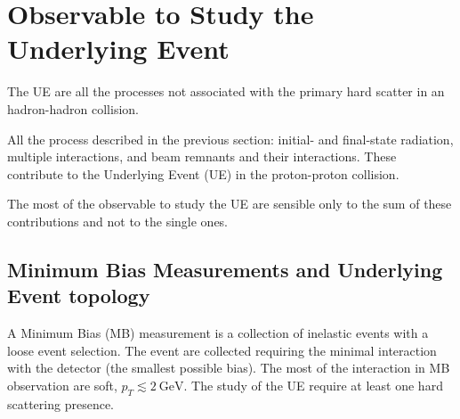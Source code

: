 \chapter{Observable to Study the Underlying Event}

The UE are all the processes not associated with the primary hard scatter in an hadron-hadron collision.

All the process described in the previous section: initial- and final-state radiation, multiple interactions, and beam
remnants and their interactions. These contribute to the Underlying Event (UE) in the proton-proton collision.

The most of the observable to study the UE are sensible only to the sum of these contributions and not to the single ones.

\section{Minimum Bias Measurements and Underlying Event topology}

A Minimum Bias (MB) measurement is a collection of inelastic events with a loose event selection. The event are collected requiring the minimal interaction with the detector (the smallest possible bias). The most of the interaction in MB observation are soft, $p_T\lesssim2\ \mathrm{GeV}$. The study of the UE require at least one hard scattering presence.
  